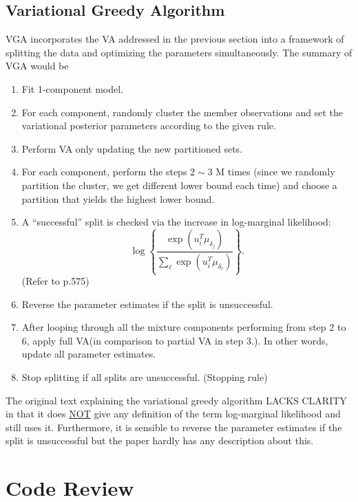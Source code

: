 \documentclass[11pt]{article}
\begin{document}
\subsection{Variational Greedy Algorithm}
  VGA incorporates the VA addressed in the previous section into a framework of splitting the data and optimizing the parameters simultaneously. The summary of VGA would be
  \begin{enumerate}
    \item \textcolor{myorange}{Fit} 1-component model.
    \item For each component, \textcolor{myorange}{randomly cluster} the member observations and set the variational posterior parameters according to the given rule.
    \item Perform VA \textcolor{myorange}{only} updating the new partitioned sets.
    \item For each component, perform the steps $2 \sim 3$ \textcolor{myorange}{M times} (since we randomly partition the cluster, we get different lower bound each time) and choose a partition that yields the highest lower bound.
    \item A ``\textcolor{myorange}{successful}'' split is checked via the increase in log-marginal likelihood:
    $$
      \log \left\{\frac{\exp \left(u_{i}^{T}\mu_{\delta_{j}} \right)}{\sum_{\ell} \exp \left(u_{i}^{T}\mu_{\delta_{\ell}} \right)} \right\}.
    $$
    (Refer to p.575)
    \item Reverse the parameter estimates if the split is \textcolor{myorange}{unsuccessful}.
    \item After looping through all the mixture components performing from step 2 to 6, apply \textcolor{myblue}{full VA}(in comparison to \textcolor{myorange}{partial VA} in step 3.). In other words, update \textcolor{myorange}{all} parameter estimates.
    \item \textcolor{myorange}{Stop} splitting if all splits are \textcolor{myorange}{unsuccessful}. (Stopping rule)
  \end{enumerate}
  The original text explaining the variational greedy algorithm LACKS CLARITY in that it does \underline{NOT} give any definition of the term \textcolor{myblue}{log-marginal likelihood} and still uses it. Furthermore, it is sensible to reverse the parameter estimates if the split is unsuccessful but the paper hardly has any description about this. 

\section{Code Review}
\end{document}
